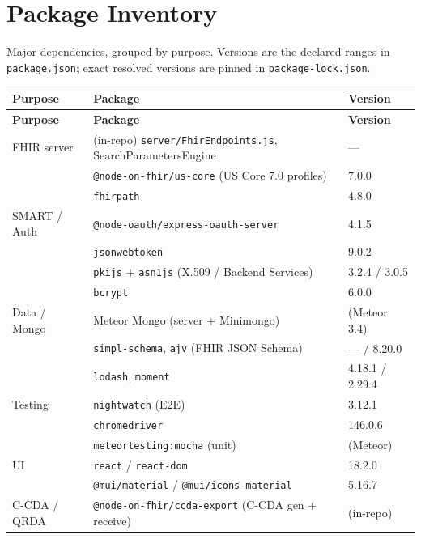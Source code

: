 \section{Package Inventory}

Major dependencies, grouped by purpose. Versions are the declared ranges in
\texttt{package.json}; exact resolved versions are pinned in
\texttt{package-lock.json}.

\begin{longtable}{lll}
\toprule
\textbf{Purpose} & \textbf{Package} & \textbf{Version} \\
\midrule
\endfirsthead
\toprule
\textbf{Purpose} & \textbf{Package} & \textbf{Version} \\
\midrule
\endhead
\bottomrule
\endfoot
FHIR server      & (in-repo) \texttt{server/FhirEndpoints.js}, SearchParametersEngine & --- \\
                 & \texttt{@node-on-fhir/us-core} (US Core 7.0 profiles) & 7.0.0 \\
                 & \texttt{fhirpath} & 4.8.0 \\
\midrule
SMART / Auth     & \texttt{@node-oauth/express-oauth-server} & 4.1.5 \\
                 & \texttt{jsonwebtoken} & 9.0.2 \\
                 & \texttt{pkijs} + \texttt{asn1js} (X.509 / Backend Services) & 3.2.4 / 3.0.5 \\
                 & \texttt{bcrypt} & 6.0.0 \\
\midrule
Data / Mongo     & Meteor Mongo (server + Minimongo) & (Meteor 3.4) \\
                 & \texttt{simpl-schema}, \texttt{ajv} (FHIR JSON Schema) & --- / 8.20.0 \\
                 & \texttt{lodash}, \texttt{moment} & 4.18.1 / 2.29.4 \\
\midrule
Testing          & \texttt{nightwatch} (E2E) & 3.12.1 \\
                 & \texttt{chromedriver} & 146.0.6 \\
                 & \texttt{meteortesting:mocha} (unit) & (Meteor) \\
\midrule
UI               & \texttt{react} / \texttt{react-dom} & 18.2.0 \\
                 & \texttt{@mui/material} / \texttt{@mui/icons-material} & 5.16.7 \\
\midrule
C-CDA / QRDA     & \texttt{@node-on-fhir/ccda-export} (C-CDA gen + receive) & (in-repo) \\

\end{longtable}
